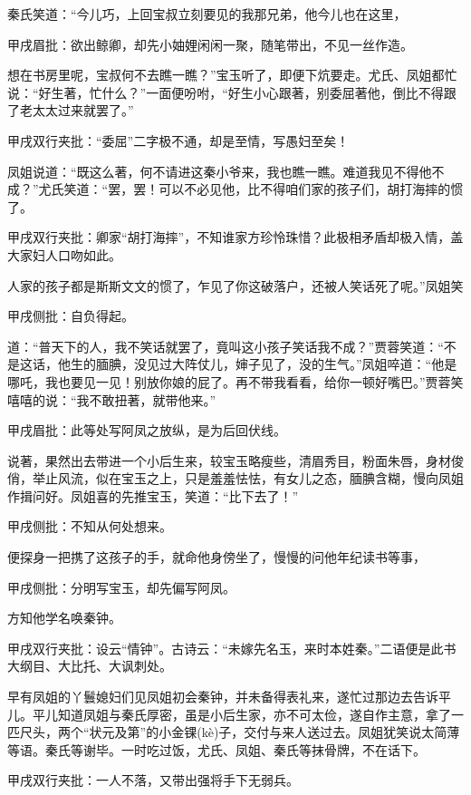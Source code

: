 \begin{parag}
    秦氏笑道：“今儿巧，上回宝叔立刻要见的我那兄弟，他今儿也在这里，\begin{note}甲戌眉批：欲出鲸卿，却先小妯娌闲闲一聚，随笔带出，不见一丝作造。\end{note}想在书房里呢，宝叔何不去瞧一瞧？”宝玉听了，即便下炕要走。尤氏、凤姐都忙说：“好生著，忙什么？”一面便吩咐，“好生小心跟著，别委屈著他，倒比不得跟了老太太过来就罢了。”\begin{note}甲戌双行夹批：“委屈”二字极不通，却是至情，写愚妇至矣！\end{note}凤姐说道：“既这么著，何不请进这秦小爷来，我也瞧一瞧。难道我见不得他不成？”尤氏笑道：“罢，罢！可以不必见他，比不得咱们家的孩子们，胡打海摔的惯了。\begin{note}甲戌双行夹批：卿家“胡打海摔”，不知谁家方珍怜珠惜？此极相矛盾却极入情，盖大家妇人口吻如此。\end{note}人家的孩子都是斯斯文文的惯了，乍见了你这破落户，还被人笑话死了呢。”凤姐笑\begin{note}甲戌侧批：自负得起。\end{note}道：“普天下的人，我不笑话就罢了，竟叫这小孩子笑话我不成？”贾蓉笑道：“不是这话，他生的腼腆，没见过大阵仗儿，婶子见了，没的生气。”凤姐啐道：“他是哪吒，我也要见一见！别放你娘的屁了。再不带我看看，给你一顿好嘴巴。”贾蓉笑嘻嘻的说：“我不敢扭著，就带他来。”\begin{note}甲戌眉批：此等处写阿凤之放纵，是为后回伏线。\end{note}
\end{parag}


\begin{parag}
    说著，果然出去带进一个小后生来，较宝玉略瘦些，清眉秀目，粉面朱唇，身材俊俏，举止风流，似在宝玉之上，只是羞羞怯怯，有女儿之态，腼腆含糊，慢向凤姐作揖问好。凤姐喜的先推宝玉，笑道：“比下去了！”\begin{note}甲戌侧批：不知从何处想来。\end{note}便探身一把携了这孩子的手，就命他身傍坐了，慢慢的问他年纪读书等事，\begin{note}甲戌侧批：分明写宝玉，却先偏写阿凤。\end{note}方知他学名唤秦钟。\begin{note}甲戌双行夹批：设云“情钟”。古诗云：“未嫁先名玉，来时本姓秦。”二语便是此书大纲目、大比托、大讽刺处。\end{note}早有凤姐的丫鬟媳妇们见凤姐初会秦钟，并未备得表礼来，遂忙过那边去告诉平儿。平儿知道凤姐与秦氏厚密，虽是小后生家，亦不可太俭，遂自作主意，拿了一匹尺头，两个“状元及第”的小金锞(kè)子，交付与来人送过去。凤姐犹笑说太简薄等语。秦氏等谢毕。一时吃过饭，尤氏、凤姐、秦氏等抹骨牌，不在话下。\begin{note}甲戌双行夹批：一人不落，又带出强将手下无弱兵。\end{note}
\end{parag}


